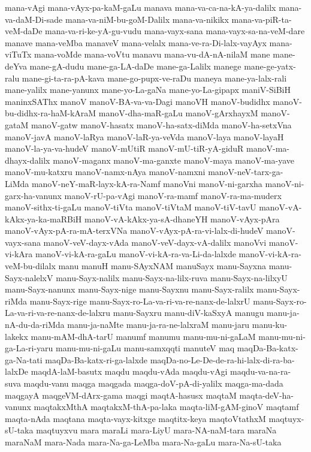 {mana-vAgi
mana-vAyx-pa-kaM-gaLu
manava
mana-va-ca-na-kA-ya-dalilx
mana-va-daM-Di-sade
mana-va-niM-bu-goM-Dalilx
mana-va-nikikx
mana-va-piR-ta-veM-daDe
mana-va-ri-ke-yA-gu-vudu
mana-vayx-sana
mana-vayx-sa-na-veM-dare
manave
mana-veMba
manaveV
mana-velalx
mana-ve-ra-Di-lalx-vayAyx
mana-viTuTx
mana-voMde
mana-voVtu
manavu
mana-vu-dA-nA-nilaM
mane
mane-deYva
mane-gA-dudu
mane-ga-LA-daDe
mane-ga-Lalilx
manege
mane-ge-yatx-ralu
mane-gi-ta-ra-pA-kava
mane-go-pupx-ve-raDu
maneya
mane-ya-lalx-rali
mane-yalilx
mane-yanunx
mane-yo-La-gaNa
mane-yo-La-gipapx
maniV-SiBiH
maninxSAThx
manoV
manoV-BA-va-va-Dagi
manoVH
manoV-budidhx
manoV-bu-didhx-ra-haM-kAraM
manoV-dha-maR-gaLu
manoV-gArxhayxM
manoV-gataM
manoV-gatw
manoV-hasatx
manoV-ha-satx-diMda
manoV-ha-setxVna
manoV-javA
manoV-laRya
manoV-laR-ya-veVda
manoV-laya
manoV-layaH
manoV-la-ya-va-hudeV
manoV-mUtiR
manoV-mU-tiR-yA-giduR
manoV-ma-dhayx-dalilx
manoV-maganx
manoV-ma-ganxte
manoV-maya
manoV-ma-yave
manoV-mu-katxru
manoV-namx-nAya
manoV-namxni
manoV-neV-tarx-ga-LiMda
manoV-neY-maR-layx-kA-ra-Namf
manoVni
manoV-ni-garxha
manoV-ni-garx-ha-vanunx
manoV-rU-pa-vAgi
manoV-ra-mamf
manoV-ra-ma-muderx
manoV-sithx-ti-gaLu
manoV-tiVta
manoV-tiVtaM
manoV-tiV-tavU
manoV-vA-kAkx-ya-ka-maRBiH
manoV-vA-kAkx-ya-sA-dhaneYH
manoV-vAyx-pAra
manoV-vAyx-pA-ra-mA-terxVNa
manoV-vAyx-pA-ra-vi-lalx-di-hudeV
manoV-vayx-sana
manoV-veV-dayx-vAda
manoV-veV-dayx-vA-dalilx
manoVvi
manoV-vi-kAra
manoV-vi-kA-ra-gaLu
manoV-vi-kA-ra-va-Li-da-lalxde
manoV-vi-kA-ra-veM-bu-dilalx
manu
manuH
manu-SAyxNAM
manuSayx
manu-Sayxna
manu-Sayx-nalelxV
manu-Sayx-nalilx
manu-Sayx-na-lilx-ruva
manu-Sayx-na-lilxyU
manu-Sayx-nanunx
manu-Sayx-nige
manu-Sayxnu
manu-Sayx-ralilx
manu-Sayx-riMda
manu-Sayx-rige
manu-Sayx-ro-La-va-ri-va-re-nanx-de-lalxrU
manu-Sayx-ro-La-va-ri-va-re-nanx-de-lalxru
manu-Sayxru
manu-diV-kaSxyA
manugu
manu-ja-nA-du-da-riMda
manu-ja-naMte
manu-ja-ra-ne-lalxraM
manu-jaru
manu-ku-lakekx
manu-mAM-dhA-tarU
manumf
manumu
manu-mu-ni-gaLaM
manu-mu-ni-ga-La-ri-yaru
manu-mu-ni-gaLu
manu-samxqqti
manuteV
maq
maqDa-Ba-katx-ga-Na-tati
maqDa-Ba-katx-ri-ga-lalxde
maqDa-no-Le-De-de-ra-hi-lalx-di-ra-ba-lalxDe
maqdA-laM-basutx
maqdu
maqdu-vAda
maqdu-vAgi
maqdu-va-na-ra-suva
maqdu-vanu
maqga
maqgada
maqga-doV-pA-di-yalilx
maqga-ma-dada
maqgayA
maqgeVM-dArx-gama
maqgi
maqtA-hasusx
maqtaM
maqta-deV-ha-vanunx
maqtakxMthA
maqtakxM-thA-pa-laka
maqta-liM-gAM-ginoV
maqtamf
maqta-nAda
maqtana
maqta-vayx-kitxge
maqtitx-keya
maqtoVtathxM
maqtuyx-sU-taka
maqtuyxvu
mara
maraLi
mara-LiyU
mara-NA-naM-tara
maraNa
maraNaM
mara-Nada
mara-Na-ga-LeMba
mara-Na-gaLu
mara-Na-sU-taka
}
